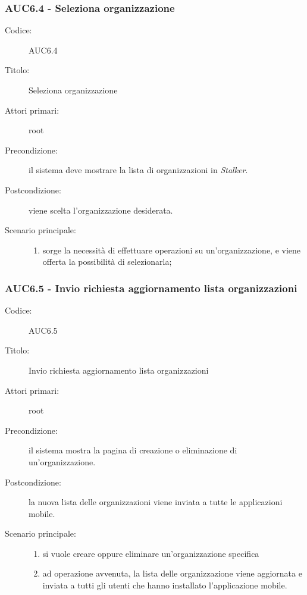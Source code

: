 \documentclass[casi-duso]{subfiles}
\begin{document}
\subsubsection{AUC6.4 - Seleziona organizzazione}%
\label{subsub:AUC6.4}
\begin{description}
  \item[Codice:] AUC6.4
  \item[Titolo:] Seleziona organizzazione
  \item[Attori primari:] root
  \item[Precondizione:] il sistema deve mostrare la lista di organizzazioni in \emph{Stalker}.
  \item[Postcondizione:] viene scelta l'organizzazione desiderata.
  \item[Scenario principale:]
  \begin{enumerate}
    \item sorge la necessità di effettuare operazioni su un'organizzazione, e viene offerta la possibilità di selezionarla;
  \end{enumerate}
\end{description}

\subsubsection{AUC6.5 - Invio richiesta aggiornamento lista organizzazioni}%
\label{subsub:AUC6.5}
\begin{description}
  \item[Codice:] AUC6.5
  \item[Titolo:] Invio richiesta aggiornamento lista organizzazioni
  \item[Attori primari:] root
  \item[Precondizione:] il sistema mostra la pagina di creazione o eliminazione di un'organizzazione.
  \item[Postcondizione:] la nuova lista delle organizzazioni viene inviata a tutte le applicazioni mobile.
  \item[Scenario principale:]
  \begin{enumerate}
    \item si vuole creare oppure eliminare un'organizzazione specifica
    \item ad operazione avvenuta, la lista delle organizzazione viene aggiornata e inviata a tutti gli utenti che hanno installato l'applicazione mobile.
  \end{enumerate}
\end{description}
\end{document}
